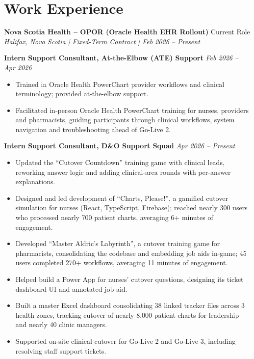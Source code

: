 \documentclass[11pt, letterpaper]{article}
\newenvironment{highlights}{
    \begin{itemize}[
        topsep=0.10 cm,
        parsep=0.10 cm,
        partopsep=0pt,
        itemsep=0pt,
        leftmargin=0.4 cm]}
        {\end{itemize}}
\newif\ifgamelinks
\newcommand{\game}[2]{\ifgamelinks\href{#2}{``#1''}\else``#1''\fi}
\begin{document}
    \section{Work Experience}

    \textbf{Nova Scotia Health – OPOR (Oracle Health EHR Rollout)} \hfill Current Role
    \vspace{0.5mm}\\
    \textit{Halifax, Nova Scotia | Fixed-Term Contract | Feb 2026 – Present}

    \vspace{1mm}
    \textbf{Intern Support Consultant, At-the-Elbow (ATE) Support} \hfill \textit{Feb 2026 – Apr 2026}
    \begin{highlights}
        \item Trained in Oracle Health PowerChart provider workflows and clinical terminology; provided at-the-elbow support.
        \item Facilitated in-person Oracle Health PowerChart training for nurses, providers and pharmacists, guiding participants through clinical workflows, system navigation and troubleshooting ahead of Go-Live 2.
    \end{highlights}

    \textbf{Intern Support Consultant, D\&O Support Squad} \hfill \textit{Apr 2026 – Present}
    \begin{highlights}
        \item Updated the \game{Cutover Countdown}{https://example.com} training game with clinical leads, reworking answer logic and adding clinical-area rounds with per-answer explanations.
        \item Designed and led development of \game{Charts, Please!}{https://example.com}, a gamified cutover simulation for nurses (React, TypeScript, Firebase); reached nearly 300 users who processed nearly 700 patient charts, averaging 6+ minutes of engagement.
        \item Developed \game{Master Aldric's Labyrinth}{https://example.com}, a cutover training game for pharmacists, consolidating the codebase and embedding job aids in-game; 45 users completed 270+ workflows, averaging 11 minutes of engagement.
        \item Helped build a Power App for nurses' cutover questions, designing its ticket dashboard UI and annotated job aid.
        \item Built a master Excel dashboard consolidating 38 linked tracker files across 3 health zones, tracking cutover of nearly 8,000 patient charts for leadership and nearly 40 clinic managers.
        \item Supported on-site clinical cutover for Go-Live 2 and Go-Live 3, including resolving staff support tickets.
    \end{highlights}
\end{document}
